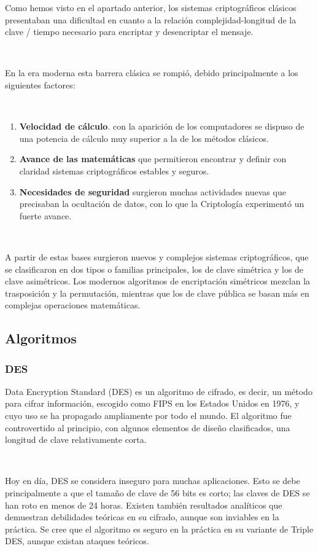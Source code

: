 \documentclass[11pt, conference]{IEEEtran}
\begin{document}
Como hemos visto en el apartado anterior, los sistemas criptográficos clásicos presentaban una dificultad en cuanto a la relación complejidad-longitud de la clave / tiempo necesario para encriptar y desencriptar el mensaje.

\

En la era moderna esta barrera clásica se rompió, debido principalmente a los siguientes factores:

\
\begin{enumerate}
	
	\item \textbf{Velocidad de cálculo}. con la aparición de los computadores se dispuso de una potencia de cálculo muy superior a la de los métodos clásicos.
	
	\item \textbf{Avance de las matemáticas} que permitieron encontrar y definir con claridad sistemas criptográficos estables y seguros.
	
	\item \textbf{Necesidades de seguridad} surgieron muchas actividades nuevas que precisaban la ocultación de datos, con lo que la Criptología experimentó un fuerte avance.
\end{enumerate}

\

A partir de estas bases surgieron nuevos y complejos sistemas criptográficos, que se clasificaron en dos tipos o familias principales, los de clave simétrica y los de clave asimétricos. Los modernos algoritmos de encriptación simétricos mezclan la trasposición y la permutación, mientras que los de clave pública se basan más en complejas operaciones matemáticas.


\subsection{Algoritmos}
\subsubsection{DES}
Data Encryption Standard (DES) es un algoritmo de cifrado, es decir, un método para cifrar información, escogido como FIPS en los Estados Unidos en 1976, y cuyo uso se ha propagado ampliamente por todo el mundo. El algoritmo fue controvertido al principio, con algunos elementos de diseño clasificados, una longitud de clave relativamente corta.\cite{h}

\

Hoy en día, DES se considera inseguro para muchas aplicaciones. Esto se debe principalmente a que el tamaño de clave de 56 bits es corto; las claves de DES se han roto en menos de 24 horas. Existen también resultados analíticos que demuestran debilidades teóricas en su cifrado, aunque son inviables en la práctica. Se cree que el algoritmo es seguro en la práctica en su variante de Triple DES, aunque existan ataques teóricos.
\end{document}
